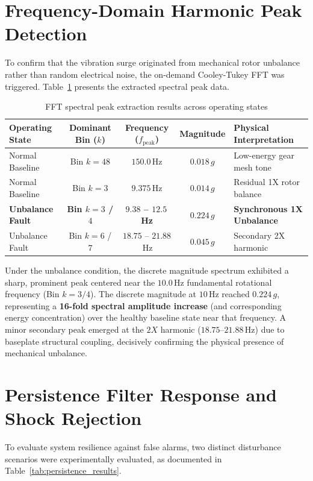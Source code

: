 \section{Frequency-Domain Harmonic Peak Detection}
\hspace{2em}To confirm that the vibration surge originated from mechanical rotor unbalance rather than random electrical noise, the on-demand Cooley-Tukey FFT was triggered. Table~\ref{tab:fft_peaks} presents the extracted spectral peak data.

\begin{table}[H]
\centering
\caption{FFT spectral peak extraction results across operating states}
\label{tab:fft_peaks}
\small
\begin{tabularx}{\textwidth}{l c c c X}
\toprule
\textbf{Operating State} & \textbf{Dominant Bin ($k$)} & \textbf{Frequency ($f_{\mathrm{peak}}$)} & \textbf{Magnitude} & \textbf{Physical Interpretation} \\
\midrule
Normal Baseline & Bin $k = 48$ & $150.0$\,Hz & $0.018\,g$ & Low-energy gear mesh tone \\
Normal Baseline & Bin $k = 3$ & $9.375$\,Hz & $0.014\,g$ & Residual 1X rotor balance \\
\midrule
\textbf{Unbalance Fault} & \textbf{Bin $k = 3$ / $4$} & \textbf{$9.38$ -- $12.5$\,Hz} & \textbf{$0.224\,g$} & \textbf{Synchronous 1X Unbalance} \\
Unbalance Fault & Bin $k = 6$ / $7$ & $18.75$ -- $21.88$\,Hz & $0.045\,g$ & Secondary 2X harmonic \\
\bottomrule
\end{tabularx}
\end{table}

\hspace{2em}Under the unbalance condition, the discrete magnitude spectrum exhibited a sharp, prominent peak centered near the $10.0$\,Hz fundamental rotational frequency (Bin $k = 3/4$). The discrete magnitude at $10$\,Hz reached $0.224\,g$, representing a \textbf{16-fold spectral amplitude increase} (and corresponding energy concentration) over the healthy baseline state near that frequency. A minor secondary peak emerged at the $2X$ harmonic ($18.75$--$21.88$\,Hz) due to baseplate structural coupling, decisively confirming the physical presence of mechanical unbalance.

\section{Persistence Filter Response and Shock Rejection}
\hspace{2em}To evaluate system resilience against false alarms, two distinct disturbance scenarios were experimentally evaluated, as documented in Table~\ref{tab:persistence_results}.

